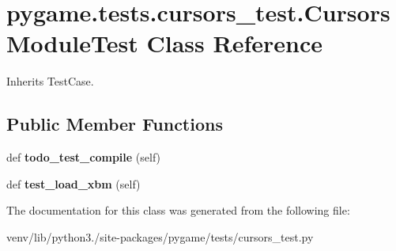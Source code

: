 \hypertarget{classpygame_1_1tests_1_1cursors__test_1_1_cursors_module_test}{}\section{pygame.\+tests.\+cursors\+\_\+test.\+Cursors\+Module\+Test Class Reference}
\label{classpygame_1_1tests_1_1cursors__test_1_1_cursors_module_test}


Inherits Test\+Case.

\subsection*{Public Member Functions}
\begin{DoxyCompactItemize}
\item 
\mbox{\label{classpygame_1_1tests_1_1cursors__test_1_1_cursors_module_test_adda59a50d14e2567826a6d276be1d8d1}} 
def {\bfseries todo\+\_\+test\+\_\+compile} (self)
\item 
\mbox{\label{classpygame_1_1tests_1_1cursors__test_1_1_cursors_module_test_a3e71b93d7c1a27ac2bbefa1a500f807a}} 
def {\bfseries test\+\_\+load\+\_\+xbm} (self)
\end{DoxyCompactItemize}


The documentation for this class was generated from the following file\+:\begin{DoxyCompactItemize}
\item 
venv/lib/python3./site-\/packages/pygame/tests/cursors\+\_\+test.\+py\end{DoxyCompactItemize}
